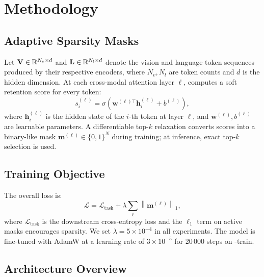 
\section{Methodology}

\subsection{Adaptive Sparsity Masks}

Let \(\mathbf{V} \in \mathbb{R}^{N_v \times d}\) and
\(\mathbf{L} \in \mathbb{R}^{N_l \times d}\) denote the vision and language
token sequences produced by their respective encoders, where
\(N_v, N_l\) are token counts and \(d\) is the hidden dimension.
At each cross-modal attention layer \(\ell\), \modelname{} computes a
soft retention score for every token:
\begin{equation}
  s^{(\ell)}_i = \sigma\!\left(\mathbf{w}^{(\ell)\top} \mathbf{h}^{(\ell)}_i + b^{(\ell)}\right),
  \label{eq:score}
\end{equation}
where \(\mathbf{h}^{(\ell)}_i\) is the hidden state of the \(i\)-th
token at layer \(\ell\), and \(\mathbf{w}^{(\ell)}, b^{(\ell)}\) are
learnable parameters. A differentiable top-\(k\) relaxation
\citep{nguyen2024sparse} converts scores into a binary-like mask
\(\mathbf{m}^{(\ell)} \in \{0,1\}^{N}\) during training; at inference,
exact top-\(k\) selection is used.

\subsection{Training Objective}

The overall loss is:
\begin{equation}
  \mathcal{L} = \mathcal{L}_{\text{task}} +
    \lambda \sum_{\ell} \left\| \mathbf{m}^{(\ell)} \right\|_1,
  \label{eq:loss}
\end{equation}
where \(\mathcal{L}_{\text{task}}\) is the downstream cross-entropy
loss and the \(\ell_1\) term on active masks encourages
sparsity. We set \(\lambda = 5\times10^{-4}\) in all experiments.
The model is fine-tuned with AdamW \citep{loshchilov2019adamw} at a
learning rate of \(3\times10^{-5}\) for 20\,000 steps on
\dataset{}-train.

\subsection{Architecture Overview}

